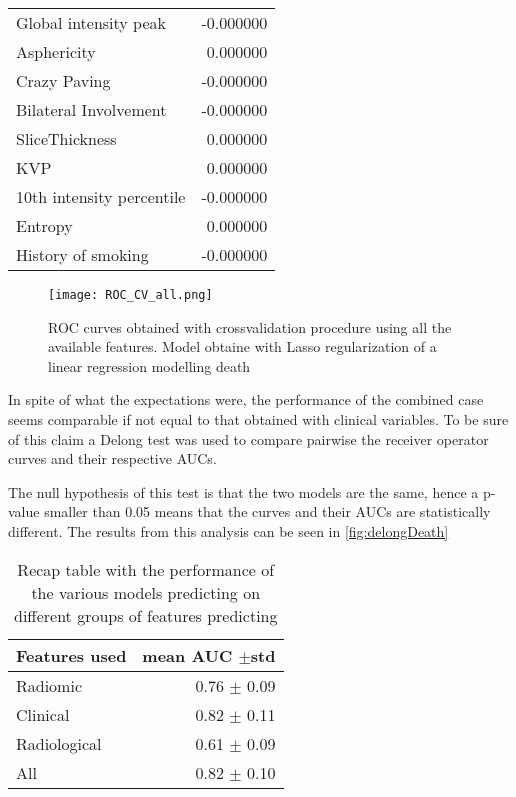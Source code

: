 \begin{table}
\begin{tabular}{lr}
			Global intensity peak               &                     -0.000000 \\
			Asphericity                         &                      0.000000 \\
			Crazy Paving                        &                     -0.000000 \\
			Bilateral Involvement               &                     -0.000000 \\
			SliceThickness                      &                      0.000000 \\
			KVP                                 &                      0.000000 \\
			10th intensity percentile           &                     -0.000000 \\
			Entropy                             &                      0.000000 \\
			History of smoking                  &                     -0.000000 \\
			\bottomrule
\end{tabular}
\end{table}

\begin{figure}[htbp]
	\centering
  		\texttt{[image: ROC\_CV\_all.png]}
        \caption{ROC curves obtained with crossvalidation procedure using all the available features. Model obtaine with Lasso regularization of a linear regression modelling death\label{fig:RocDeathAll}}
\end{figure}

In spite of what the expectations were, the performance of the combined case seems comparable if not equal to that obtained with clinical variables. To be sure of this claim a Delong test was used to compare pairwise the receiver operator curves and their respective AUCs. 

The null hypothesis of this test is that the two models are the same, hence a p-value smaller than 0.05 means that the curves and their AUCs are statistically different. The results from this analysis can be seen in \ref{fig:delongDeath}

\begin{table}
\caption{Recap table with the performance of the various models predicting on different groups of features predicting \death \label{tab:RecapDeath}}
\centering
\begin{tabular}{l|r}
\toprule
Features used & mean AUC $\pm$std\\
\midrule
Radiomic  & 0.76 $\pm$ 0.09\\
Clinical  &  0.82 $\pm$ 0.11\\
Radiological & 0.61 $\pm$ 0.09\\
All & 0.82 $\pm$ 0.10 \\
\bottomrule
\end{tabular}
\end{table}


